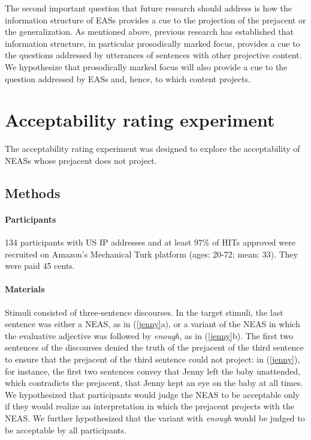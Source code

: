 \documentclass[11pt,fleqn]{article}
\newcommand{\6}{\mbox{$[\hspace*{-.6mm}[$}}
\newcommand{\9}{\mbox{$]\hspace*{-.6mm}]$}}
\begin{document}
The second important question that future research should address is how the information structure of EASs provides a cue to the projection of the prejacent or the generalization. As mentioned above, previous research has established that information structure, in particular prosodically marked focus, provides a cue to the questions addressed by utterances of sentences with other projective content. We hypothesize that prosodically marked focus will also provide a cue to the question addressed by EASs and, hence, to which content projects. 


\appendix

\section{Acceptability rating experiment}\label{s-acc}

The acceptability rating experiment was designed to explore the acceptability of  NEASs whose prejacent does not project. 

\subsection{Methods}

\paragraph{Participants} 134 participants with US IP addresses and at least 97\% of HITs approved were recruited on Amazon's Mechanical Turk platform (ages: 20-72; mean: 33). They were paid 45 cents.

\paragraph{Materials} Stimuli consisted of three-sentence discourses. In the target stimuli, the last sentence was either a NEAS, as in (\ref{jenny}a), or a variant of the NEAS in which the evaluative adjective was followed by {\em enough}, as in (\ref{jenny}b). The first two sentences of the discourses denied the truth of the prejacent of the third sentence to ensure that the prejacent of the third sentence could not project: in (\ref{jenny}), for instance, the first two sentences convey that Jenny left the baby unattended, which contradicts the prejacent, that Jenny kept an eye on the baby at all times. We hypothesized that participants would judge the NEAS to be acceptable only if they would realize an interpretation in which the prejacent projects with the NEAS. We further hypothesized that the variant with {\em enough} would be judged to be acceptable by all participants.
\end{document}
